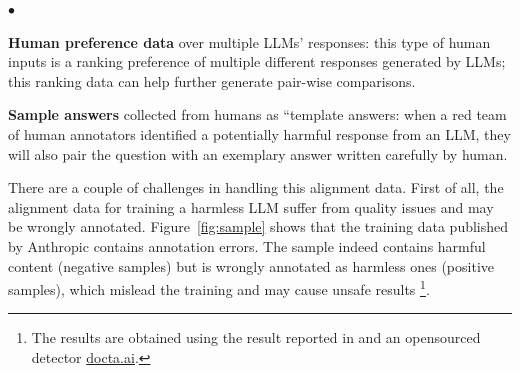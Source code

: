 \documentclass{article}
\newcommand{\squishlist}{
\begin{list}{{{\small{$\bullet$}}}}
{\setlength{\itemsep}{1pt}      \setlength{\parsep}{0pt}
\setlength{\topsep}{-2pt}       \setlength{\partopsep}{0pt}
\setlength{\leftmargin}{1em} \setlength{\labelwidth}{1em}
\setlength{\labelsep}{0.5em} } }
\newcommand{\squishend}{  \end{list}  }
\newcommand{\yl}[1]{\textbf{\color{red}(Yang: #1)}}
\newcommand{\yl}[1]{}
\begin{document}
\squishlist
    \item \textbf{Human preference data} over multiple LLMs' responses: this type of human inputs is a ranking preference of multiple different responses generated by LLMs; %
    this ranking data  can help further generate pair-wise comparisons. %
    \item \textbf{Sample answers} collected from humans as “template answers: when a red team of human annotators identified a potentially harmful response from an LLM, they will also pair the question with an exemplary answer written carefully by human. %
\squishend

\vspace{0.1in}
There are a couple of challenges in handling this alignment data. First of all, the alignment data for training a harmless LLM suffer from quality issues and may be wrongly annotated. Figure~\ref{fig:sample} shows that the training data published by Anthropic  \cite{ganguli2022red} 
contains annotation errors. The sample indeed contains harmful content (negative samples) but is wrongly annotated as harmless ones (positive samples), which mislead the training and may cause unsafe results \footnote{The results are obtained using the result reported in \cite{zhu2022detecting} and an opensourced detector \href{http://docta.ai}{docta.ai}. }. 



\end{document}
